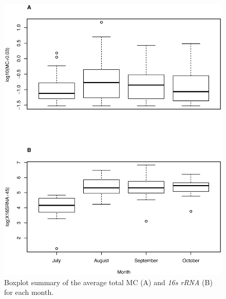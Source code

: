 \begin{figure}[!h]
 \includegraphics[width=\textwidth]{figures/time4}
 \caption{Boxplot summary of the average total MC (A) and \emph{16s rRNA} (B) for each month.}
 \label{fig:time3}
\end{figure}

